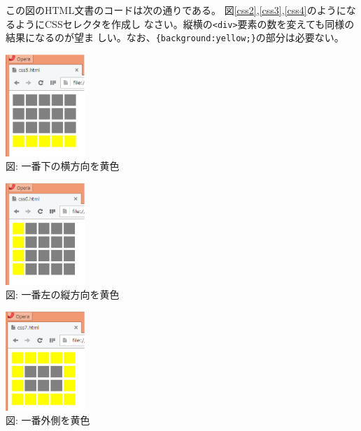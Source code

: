 \documentclass[a4j,12pt]{jreport}
\begin{document}
\begin{Prob}
 この図のHTML文書のコードは次の通りである。
  {\footnotesize
 }
 図\ref{css2},\ref{css3},\ref{css4}のようになるようにCSSセレクタを作成し
 なさい。縦横の\texttt{<div>}要素の数を変えても同様の結果になるのが望ま
 しい。なお、\verb+{background:yellow;}+の部分は必要ない。\\
\begin{minipage}{0.3\textwidth}
\begin{center}
 \includegraphics[width=3cm]{css5.eps}\\
 図\thefigure : {一番下の横方向を黄色}\label{css2}
\end{center}     
 \end{minipage}
\begin{minipage}{0.3\textwidth}
\begin{center}
 \includegraphics[width=3cm]{css6.eps}\\
 図\thefigure : {一番左の縦方向を黄色}\label{css3}
\end{center}     
 \end{minipage}
\begin{minipage}{0.3\textwidth}
\begin{center}
 \includegraphics[width=3cm]{css7.eps}\\
 図\thefigure : {一番外側を黄色}\label{css4}
\end{center}     
 \end{minipage}
\end{Prob}
\end{document}
